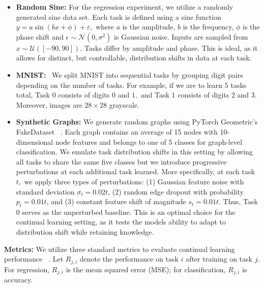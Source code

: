 \begin{itemize}
    \item \textbf{Random Sine:} For the regression experiment, we utilize a randomly generated sine data set. Each task is defined using a sine function $y = a\sin(bx + \phi) + \varepsilon,$ where $a$ is the amplitude, $b$ is the frequency, $\phi$ is the phase shift and $\epsilon \sim \mathcal{N}(0, \sigma^2)$ is Gaussian noise. Inputs are sampled from $x \sim \mathcal{U}([-90, 90])$. Tasks differ by amplitude and phase. This is ideal, as it allows for distinct, but controllable, distribution shifts in data at each task.

    \item \textbf{MNIST:}~\cite{lecun1998mnist} We split MNIST into sequential tasks by grouping digit pairs depending on the number of tasks. For example, if we are to learn $5$ tasks total, Task $0$ consists of digits $0$ and $1,$ and Task 1 consists of digits $2$ and $3.$ Moreover, images are $28 \times 28$ grayscale.

    \item \textbf{Synthetic Graphs:} We generate random graphs using PyTorch Geometric's FakeDataset ~\cite{pyg}. Each graph contains an average of 15 nodes with 10-dimensional node features and belongs to one of 5 classes for graph-level classification. We emulate task distribution shifts in this setting by allowing all tasks to share the same five classes but we introduce progressive perturbations at each additional task learned. More specifically, at each task $t,$ we apply three types of perturbations: (1) Gaussian feature noise with standard deviation $\sigma_t = 0.02t$, (2) random edge dropout with probability $p_t = 0.01t$, and (3) constant feature shift of magnitude $s_t = 0.01t$. Thus, Task $0$ serves as the unperturbed baseline. This is an optimal choice for the continual learning setting, as it tests the models ability to adapt to distribution shift while retaining knowledge.
\end{itemize}

\textbf{Metrics:} We utilize three standard metrics to evaluate continual learning performance ~\cite{lopez2017gradient, chaudhry2018riemannian, diaz2018dont}. Let $R_{j,i}$ denote the performance on task $i$ after training on task $j$. For regression, $R_{j,i}$ is the mean squared error (MSE); for classification, $R_{j,i}$ is accuracy.



